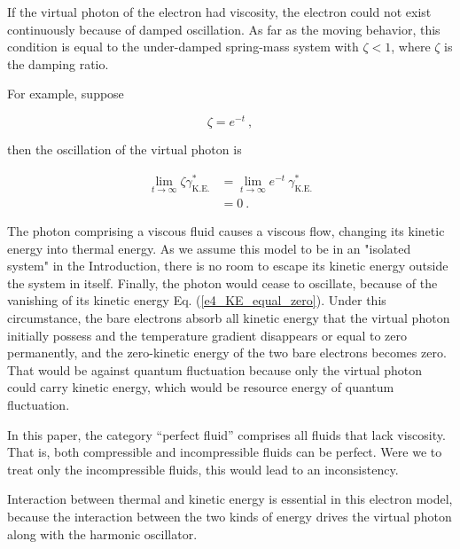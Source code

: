 \documentclass[%
 reprint,
 amsmath,amssymb,
 aps,
]{revtex4-1}
\numberwithin{equation}{section}%
\begin{document}
    If the virtual photon of the electron had viscosity, the electron could not exist continuously because of damped oscillation. As far as the moving behavior, this condition is equal to the under-damped spring-mass system with $\zeta < 1$, where $\zeta$ is the damping ratio.
        
    For example, suppose
        
        \begin{equation}
            \zeta = e^{-t}
            \ ,
        \end{equation}
            
    then the oscillation of the virtual photon is
        
        \begin{equation}
            \begin{split}
                \lim_{t \to \infty} \zeta \gamma^{*}_{\mathrm{K.E.}}
                &= \lim_{t \to \infty} e^{-t} \   \gamma^{*}_{\mathrm{K.E.}} \\
                &= 0
                \ .
                \label{e4_KE_equal_zero}
            \end{split}
        \end{equation}

    The photon comprising a viscous fluid causes a viscous flow, changing its kinetic energy into thermal energy. As we assume this model to be in an "isolated system" in the Introduction, there is no room to escape its kinetic energy outside the system in itself. Finally, the photon would cease to oscillate, because of the vanishing of its kinetic energy Eq. (\ref{e4_KE_equal_zero}). Under this circumstance, the bare electrons absorb all kinetic energy that the virtual photon initially possess and the temperature gradient disappears or equal to zero permanently, and the zero-kinetic energy of the two bare electrons becomes zero. That would be against quantum fluctuation because only the virtual photon could carry kinetic energy, which would be resource energy of quantum fluctuation.
        
    In this paper, the category ``perfect fluid'' comprises all fluids that lack viscosity. That is, both compressible and incompressible fluids can be perfect. Were we to treat only the incompressible fluids, this would lead to an inconsistency.
        
    Interaction between thermal and kinetic energy is essential in this electron model, because the interaction between the two kinds of energy drives the virtual photon along with the harmonic oscillator. 
\end{document}
